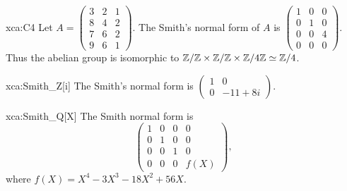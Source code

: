 \begin{sol}{xca:C4}
    Let $A=\begin{pmatrix}
    3 & 2 & 1 \\
    8 & 4 & 2 \\
    7 & 6 & 2\\
    9 & 6 & 1
    \end{pmatrix}$.  
    The Smith's normal form of $A$  
    is $\begin{pmatrix}
        1 & 0 & 0 \\
        0 & 1 & 0 \\
        0 & 0 & 4 \\
        0 & 0 & 0
    \end{pmatrix}$. Thus the abelian group is isomorphic to $\mathbb{Z}/\mathbb{Z}\times\mathbb{Z}/\mathbb{Z}\times\mathbb{Z}/4\mathbb{Z}\simeq\mathbb{Z}/4$.  
\end{sol}

 \begin{sol}{xca:Smith_Z[i]}
 	The Smith's normal form is $\begin{pmatrix}
 		1 & 0\\
 		0 & -11+8i
 	\end{pmatrix}$. 
\end{sol}




\begin{sol}{xca:Smith_Q[X]}
 	The Smith normal form is 
 	\[
 		\begin{pmatrix}
 			1 & 0 & 0 & 0 \\
 			0 & 1 & 0 & 0 \\
 			0 & 0 & 1 & 0 \\
 			0 & 0 & 0 & f(X)
 		\end{pmatrix},
 	\]
 	where $f(X)=X^4 - 3X^3 - 18X^2 + 56X$. 
 \end{sol}

